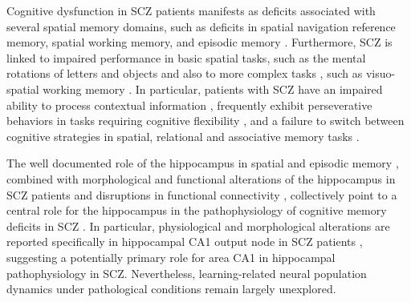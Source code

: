 Cognitive dysfunction in SCZ patients manifests as deficits associated with several spatial memory domains, such as deficits in spatial navigation reference memory, spatial working memory, and episodic memory \citep{Hanlon2006, Piskulic2007, Ranganath2008, Schaefer2013, Wilkins2013}. Furthermore, SCZ is linked to impaired performance in basic spatial tasks, such as the mental rotations of letters and objects \citep{DeVignemont2006} and also to more complex tasks \citep{Landgraf2011, Weniger2008}, such as visuo-spatial working memory \citep[see review][]{Piskulic2007}. In particular, patients with SCZ have an impaired ability to process contextual information \citep{Barch2003, Cohen1999, Maren2013}, frequently exhibit perseverative behaviors in tasks requiring cognitive flexibility \citep{Crider1997, Leeson2009, Morice1990}, and a failure to switch between cognitive strategies in spatial, relational and associative memory tasks \citep{Armstrong2012, Hanlon2006, Sheffield2012, Wilkins2013}.

The well documented role of the hippocampus in spatial and episodic memory \citep{Burgess2002, Buzsaki2013, Dickerson2010, Eichenbaum2000, Eichenbaum2014}, combined with morphological and functional alterations of the hippocampus in SCZ patients \citep{Narr2004, Vita2006, Witthaus2010, Zhou2008, Heckers2010, Meyer-Lindenberg2005, Tamminga2010, Collin2011, Debbane2006, Flahault2012} and disruptions in functional connectivity \citep{Harrison2001, Hutcheson2015}, collectively point to a central role for the hippocampus in the pathophysiology of cognitive memory deficits in SCZ \citep{Achim2005, Bast2011}. In particular, physiological and morphological alterations are reported specifically in hippocampal CA1 output node in SCZ patients \citep{Narr2004, Zierhut2013}, suggesting a potentially primary role for area CA1 in hippocampal pathophysiology in SCZ. Nevertheless, learning-related neural population dynamics under pathological conditions remain largely unexplored.


